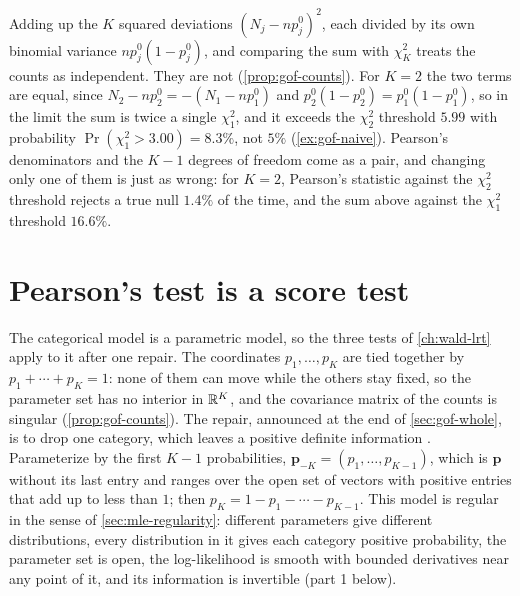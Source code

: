 \begin{pitfall}
Adding up the $K$ squared deviations $(N_j - np^0_j)^2$, each divided by its own binomial variance $np^0_j(1 - p^0_j)$, and comparing the sum with $\chi^2_K$ treats the counts as independent.
They are not (\cref{prop:gof-counts}).
For $K = 2$ the two terms are equal, since $N_2 - np^0_2 = -(N_1 - np^0_1)$ and $p^0_2(1 - p^0_2) = p^0_1(1 - p^0_1)$, so in the limit the sum is twice a single $\chi^2_1$, and it exceeds the $\chi^2_2$ threshold $5.99$ with probability $\Pr(\chi^2_1 > 3.00) = 8.3\%$, not $5\%$ (\cref{ex:gof-naive}).
Pearson's denominators and the $K - 1$ degrees of freedom come as a pair, and changing only one of them is just as wrong: for $K = 2$, Pearson's statistic against the $\chi^2_2$ threshold rejects a true null $1.4\%$ of the time, and the sum above against the $\chi^2_1$ threshold $16.6\%$.
\end{pitfall}

\section{Pearson's test is a score test}
\label{sec:gof-score}

The categorical model is a parametric model, so the three tests of \cref{ch:wald-lrt} apply to it after one repair.
The coordinates $p_1, \ldots, p_K$ are tied together by $p_1 + \cdots + p_K = 1$: none of them can move while the others stay fixed, so the parameter set has no interior in $\mathbb{R}^K$, and the covariance matrix of the counts is singular (\cref{prop:gof-counts}).
The repair, announced at the end of \cref{sec:gof-whole}, is to drop one category, which leaves a positive definite information .
Parameterize by the first $K - 1$ probabilities, $\mathbf{p}_{-K} = (p_1, \ldots, p_{K-1})$, which is $\mathbf{p}$ without its last entry and ranges over the open set of vectors with positive entries that add up to less than $1$; then $p_K = 1 - p_1 - \cdots - p_{K-1}$.
This model is regular in the sense of \cref{sec:mle-regularity}: different parameters give different distributions, every distribution in it gives each category positive probability, the parameter set is open, the log-likelihood is smooth with bounded derivatives near any point of it, and its information is invertible (part 1 below).

